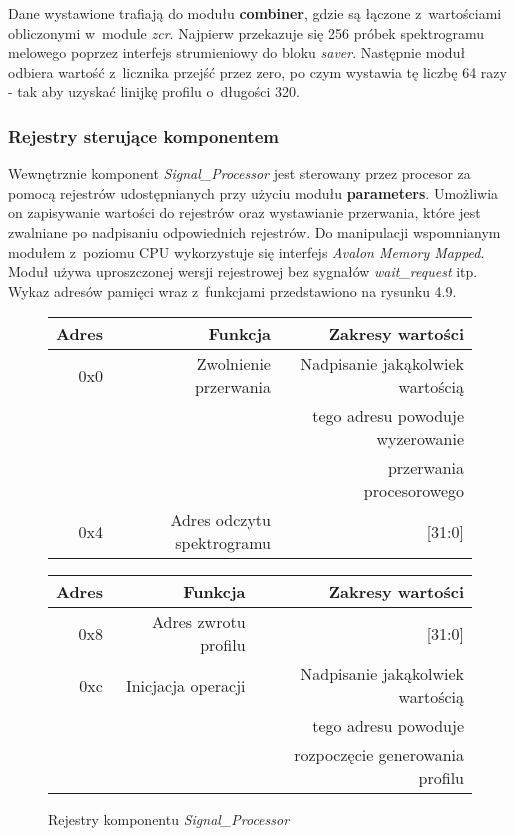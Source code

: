 Dane wystawione trafiają do modułu \textbf{combiner}, gdzie są łączone z~wartościami obliczonymi w~module \textit{zcr}. Najpierw przekazuje się 256 próbek spektrogramu melowego poprzez interfejs strumieniowy do bloku \textit{saver}. Następnie moduł odbiera wartość z~licznika przejść przez zero, po czym wystawia tę liczbę 64 razy - tak aby uzyskać linijkę profilu o~długości 320.
 
\subsubsection{Rejestry sterujące komponentem}

Wewnętrznie komponent \textit{Signal\_Processor} jest sterowany przez procesor za pomocą rejestrów udostępnianych przy użyciu modułu \textbf{parameters}. Umożliwia on zapisywanie wartości do rejestrów oraz wystawianie przerwania, które jest zwalniane po nadpisaniu odpowiednich rejestrów. Do manipulacji wspomnianym modułem z~poziomu CPU wykorzystuje się interfejs \textit{Avalon Memory Mapped}. Moduł używa uproszczonej wersji rejestrowej bez sygnałów \textit{wait\_request} itp. Wykaz adresów pamięci wraz z~funkcjami przedstawiono na rysunku 4.9.

\begin{figure}[h]
	\centering
	\begin{tabular}{|r|r|r|}
		\hline
		Adres & Funkcja & Zakresy wartości\\
		\hline
		0x0 & Zwolnienie przerwania & Nadpisanie jakąkolwiek wartością \\
			&						& tego adresu powoduje wyzerowanie\\
			&						& przerwania procesorowego\\
		
		\hline 
		0x4 & Adres odczytu spektrogramu & [31:0]\\
		\hline
	\end{tabular}
\end{figure}
\begin{figure}[h]
	\centering
	\begin{tabular}{|r|r|r|}
		\hline
		Adres & Funkcja & Zakresy wartości\\
		\hline 
		0x8 & Adres zwrotu profilu & [31:0]\\
		
		\hline 
		0xc & Inicjacja operacji &Nadpisanie jakąkolwiek wartością \\
		&& tego adresu powoduje  \\
		&& rozpoczęcie generowania profilu\\
		\hline
	\end{tabular}
	
	\caption{Rejestry komponentu \textit{Signal\_Processor}}
\end{figure}
\FloatBarrier %

